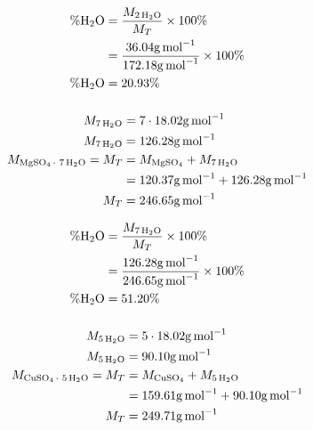 \documentclass{article}
\begin{document}
\begin{align*}
    \%\ce{H2O} & = \frac{M_{\ce{2H2O}}}{M_T} \times 100\%                                \\
               & = \frac{36.04\si{\gram\per\mol}}{172.18\si{\gram\per\mol}} \times 100\% \\
    \%\ce{H2O} & = 20.93\%
\end{align*}

\subsubsection{}

\begin{align*}
    M_{\ce{7H2O}}              & = 7 \cdot 18.02\si{\gram\per\mol}                     \\
    M_{\ce{7H2O}}              & = 126.28\si{\gram\per\mol}                            \\
    M_{\ce{MgSO4* 7H2O}} = M_T & = M_{\ce{MgSO4}} + M_{\ce{7H2O}}                      \\
                               & = 120.37\si{\gram\per\mol} + 126.28\si{\gram\per\mol} \\
    M_T                        & = 246.65\si{\gram\per\mol}
\end{align*}

\begin{align*}
    \%\ce{H2O} & = \frac{M_{\ce{7H2O}}}{M_T} \times 100\%                                 \\
               & = \frac{126.28\si{\gram\per\mol}}{246.65\si{\gram\per\mol}} \times 100\% \\
    \%\ce{H2O} & = 51.20\%
\end{align*}

\subsubsection{}

\begin{align*}
    M_{\ce{5H2O}}              & = 5 \cdot 18.02\si{\gram\per\mol}                    \\
    M_{\ce{5H2O}}              & = 90.10\si{\gram\per\mol}                            \\
    M_{\ce{CuSO4* 5H2O}} = M_T & = M_{\ce{CuSO4}} + M_{\ce{5H2O}}                     \\
                               & = 159.61\si{\gram\per\mol} + 90.10\si{\gram\per\mol} \\
    M_T                        & = 249.71\si{\gram\per\mol}
\end{align*}
\end{document}
